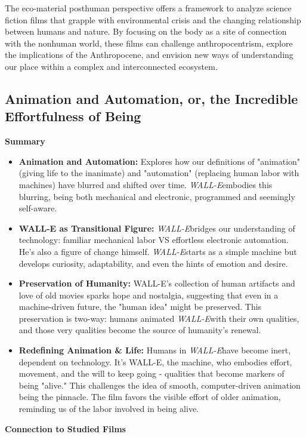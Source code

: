 \documentclass[11pt,fleqn]{book} %
\begin{document}
\vspace{5pt}
The eco-material posthuman perspective offers a framework to analyze science fiction films that grapple with environmental crisis and the changing relationship between humans and nature. By focusing on the body as a site of connection with the nonhuman world, these films can challenge anthropocentrism, explore the implications of the Anthropocene, and envision new ways of understanding our place within a complex and interconnected ecosystem.



\subsection{Animation and Automation, or, the Incredible Effortfulness of Being}
\textbf{Summary}

\begin{itemize}
\item \textbf{Animation and Automation:} Explores how our definitions of "animation" (giving life to the inanimate) and "automation" (replacing human labor with machines) have blurred and shifted over time. \textit{WALL-E}embodies this blurring, being both mechanical and electronic, programmed and seemingly self-aware.

\item \textbf{WALL-E as Transitional Figure:} \textit{WALL-E}bridges our understanding of technology: familiar mechanical labor VS effortless electronic automation. He's also a figure of change himself.  \textit{WALL-E}starts as a simple machine but develops curiosity, adaptability, and even the hints of emotion and desire.

\item \textbf{Preservation of Humanity:} WALL-E's collection of human artifacts and love of old movies sparks hope and nostalgia, suggesting that even in a machine-driven future, the "human idea" might be preserved. This preservation is two-way: humans animated \textit{WALL-E}with their own qualities, and those very qualities become the source of humanity's renewal.

\item \textbf{Redefining Animation \& Life:} Humans in \textit{WALL-E}have become inert, dependent on technology. It's WALL-E, the machine, who embodies effort, movement, and the will to keep going - qualities that become markers of being "alive." This challenges the idea of smooth, computer-driven animation being the pinnacle. The film favors the visible effort of older animation, reminding us of the labor involved in being alive. 
\end{itemize}
\vspace{5pt}
\textbf{Connection to Studied Films}
\end{document}
